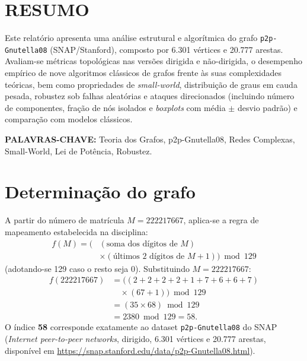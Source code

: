\documentclass[10pt,a4paper,twocolumn]{article}
\begin{document}
\thispagestyle{plain}

\section*{RESUMO}
Este relatório apresenta uma análise estrutural e algorítmica do grafo \texttt{p2p-Gnutella08} (SNAP/Stanford), composto por 6.301 vértices e 20.777 arestas. Avaliam-se métricas topológicas nas versões dirigida e não-dirigida, o desempenho empírico de nove algoritmos clássicos de grafos frente às suas complexidades teóricas, bem como propriedades de \emph{small-world}, distribuição de graus em cauda pesada, robustez sob falhas aleatórias e ataques direcionados (incluindo número de componentes, fração de nós isolados e \emph{boxplots} com média $\pm$ desvio padrão) e comparação com modelos clássicos.

\medskip\noindent\textbf{PALAVRAS-CHAVE:} Teoria dos Grafos, p2p-Gnutella08, Redes Complexas, Small-World, Lei de Potência, Robustez.

\section{Determinação do grafo}
A partir do número de matrícula $M = 222217667$, aplica-se a regra de mapeamento estabelecida na disciplina:
\begin{align*}
f(M) = \big(&(\text{soma dos dígitos de } M) \\
            &\times (\text{últimos 2 dígitos de } M + 1)\big) \bmod 129
\end{align*}
(adotando-se 129 caso o resto seja 0). Substituindo $M = 222217667$:
\begin{align*}
f(222217667) &= \big((2+2+2+2+1+7+6+6+7) \\
             &\quad \times (67 + 1)\big) \bmod 129 \\
             &= (35 \times 68) \bmod 129 \\
             &= 2380 \bmod 129 = 58.
\end{align*}
O índice \textbf{58} corresponde exatamente ao dataset \texttt{p2p-Gnutella08} do SNAP (\emph{Internet peer-to-peer networks}, dirigido, 6.301 vértices e 20.777 arestas, disponível em \url{https://snap.stanford.edu/data/p2p-Gnutella08.html}).
\end{document}
